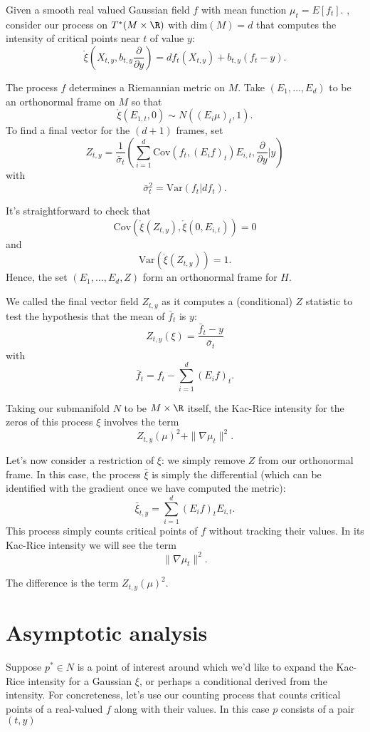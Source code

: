 \documentclass{article}
\newcommand{\jt}[1]{{\bf{{\red{[{JT: #1}]}}}}}
\newcommand{\randsec}{\xi}
\newcommand{\linprocess}{\mathring{\randsec}}
\begin{document}
\begin{eqaution}
Given a smooth real valued Gaussian field $f$ with mean
function $\mu_t=E[f_t]$. , consider our process on $T^*(M \times \R)$ with $\text{dim}(M)=d$
that computes
the intensity of critical points near $t$ of value $y$:
$$
\linprocess\left(X_{t,y}, b_{t,y} \frac{\partial}{\partial y} \right) =  df_t(X_{t,y}) + b_{t,y}(f_t - y) .
$$

The process $f$ determines a Riemannian metric on $M$. Take $(E_1, \dots, E_d)$ to be an orthonormal
frame on $M$ so that
$$
\linprocess(E_{1,t}, 0) \sim N((E_{i}\mu)_t, 1).
$$
To find a final vector for the $(d+1)$ frames, set
$$
Z_{t,y} = \frac{1}{\bar{\sigma}_t}\left( \sum_{i=1}^d \text{Cov}(f_t, (E_if)_t) E_{i,t}, \frac{\partial}{\partial y} \biggl|y \right)
$$
with
$$
\bar{\sigma}^2_t = \text{Var}(f_t|df_t).
$$

It's straightforward to check that
$$\text{Cov}(\linprocess(Z_{t,y}), \linprocess(0, E_{i,t})) = 0$$ and
$$
\text{Var}(\linprocess(Z_{t,y}))=1.
$$
Hence, the set $(E_1,\dots, E_d, Z)$ form an orthonormal frame for $H$.

We called the final vector field $Z_{t,y}$ as it computes a (conditional) $Z$ statistic to test the
hypothesis that the mean of $\bar{f}_t$ is $y$:
$$
Z_{t,y}(\randsec) = \frac{\bar{f}_t - y}{\bar{\sigma}_t}
$$
with
$$
\bar{f}_t = f_t - \sum_{i=1}^d (E_if)_t.
$$

Taking our submanifold $N$ to be  $M \times \R$ itself, 
the Kac-Rice intensity for the zeros of this process $\randsec$ involves the term
$$
Z_{t,y}(\mu)^2 + \|\nabla \mu_t\|^2.
$$

Let's now consider a restriction of $\randsec$: we simply remove $Z$ from our orthonormal frame. In this case,
the process $\bar{\randsec}$ is simply the differential (which can be identified with the gradient once
we have computed the metric):
$$
\bar{\randsec}_{t,y} = \sum_{i=1}^d (E_if)_t E_{i,t}.
$$
This process simply counts critical points of $f$ without tracking their values. In its Kac-Rice
intensity we will see the term
$$
\|\nabla \mu_t\|^2.
$$

The difference is the term $Z_{t,y}(\mu)^2$. \jt{This is the source of goldilocks!}

\section{Asymptotic analysis}

Suppose $p^* \in N$ is a point of interest around which we'd like to expand the Kac-Rice intensity for a
Gaussian $\randsec$, or perhaps a conditional derived from the intensity. For concreteness, let's use our
counting process that counts critical points of a real-valued $f$ along with their values. In this
case $p$ consists of a pair $(t,y)$ 


\end{eqaution}
\end{document}
